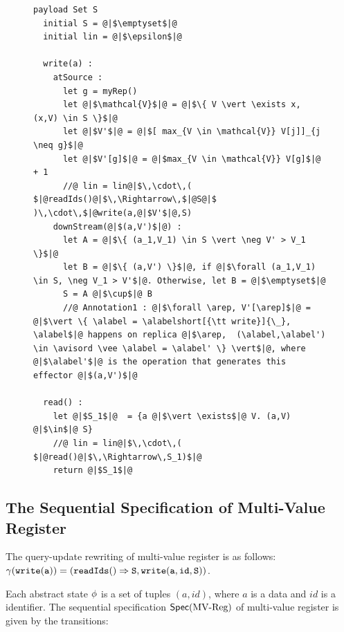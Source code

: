 \begin{figure}[t]
\begin{lstlisting}[frame=top,caption={Pseudo-code of operation-based multi-value register},
captionpos=b,label={lst:operation-based multi-value register}]
  payload Set S
  initial S = @|$\emptyset$|@
  initial lin = @|$\epsilon$|@

  write(a) :
    atSource :
      let g = myRep()
      let @|$\mathcal{V}$|@ = @|$\{ V \vert \exists x, (x,V) \in S \}$|@
      let @|$V'$|@ = @|$[ max_{V \in \mathcal{V}} V[j]]_{j \neq g}$|@
      let @|$V'[g]$|@ = @|$max_{V \in \mathcal{V}} V[g]$|@ + 1
      //@ lin = lin@|$\,\cdot\,( $|@readIds()@|$\,\Rightarrow\,$|@S@|$ )\,\cdot\,$|@write(a,@|$V'$|@,S)
    downStream(@|$(a,V')$|@) :
      let A = @|$\{ (a_1,V_1) \in S \vert \neg V' > V_1 \}$|@
      let B = @|$\{ (a,V') \}$|@, if @|$\forall (a_1,V_1) \in S, \neg V_1 > V'$|@. Otherwise, let B = @|$\emptyset$|@
      S = A @|$\cup$|@ B
      //@ Annotation1 : @|$\forall \arep, V'[\arep]$|@ = @|$\vert \{ \alabel = \alabelshort[{\tt write}]{\_}, \alabel$|@ happens on replica @|$\arep,  (\alabel,\alabel') \in \avisord \vee \alabel = \alabel' \} \vert$|@, where @|$\alabel'$|@ is the operation that generates this effector @|$(a,V')$|@

  read() :
    let @|$S_1$|@  = {a @|$\vert \exists$|@ V. (a,V) @|$\in$|@ S}
    //@ lin = lin@|$\,\cdot\,( $|@read()@|$\,\Rightarrow\,S_1)$|@
    return @|$S_1$|@
\end{lstlisting}
\end{figure}




\subsection{The Sequential Specification of Multi-Value Register}
\label{subsec:the sequential specification of multi-value register}

The query-update rewriting of multi-value register is as follows: $\gamma( \alabelshort[{\tt write}]{a}) = ( \alabellong[{\tt readIds}]{}{S}{}, \alabelshort[{\tt write}]{a,id,S})$.

Each abstract state $\phi$ is a set of tuples $(a,id)$, where $a$ is a data and $id$ is a identifier. The sequential specification $\mathsf{Spec}(\text{MV\text{-}Reg})$ of multi-value register is given by the transitions:

